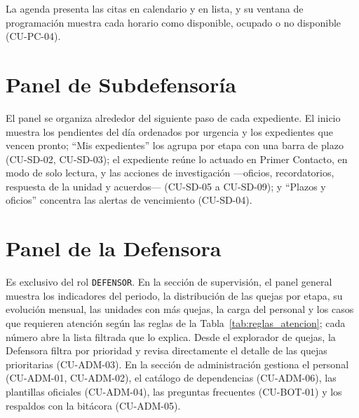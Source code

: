 	La agenda presenta las citas en calendario y en lista, y su ventana de programación muestra cada
	horario como disponible, ocupado o no disponible (CU-PC-04).

	\section{Panel de Subdefensoría}
	\label{sec:modulo_subdefensoria}
	El panel se organiza alrededor del siguiente paso de cada expediente. El inicio muestra los
	pendientes del día ordenados por urgencia y los expedientes que vencen pronto; ``Mis expedientes''
	los agrupa por etapa con una barra de plazo (CU-SD-02, CU-SD-03); el expediente reúne lo actuado en
	Primer Contacto, en modo de solo lectura, y las acciones de investigación ---oficios, recordatorios,
	respuesta de la unidad y acuerdos--- (CU-SD-05 a CU-SD-09); y ``Plazos y oficios'' concentra las
	alertas de vencimiento (CU-SD-04).

	\section{Panel de la Defensora}
	\label{sec:modulo_admin}
	Es exclusivo del rol \texttt{DEFENSOR}. En la sección de supervisión, el panel general muestra los
	indicadores del periodo, la distribución de las quejas por etapa, su evolución mensual, las unidades
	con más quejas, la carga del personal y los casos que requieren atención según las reglas de la
	Tabla~\ref{tab:reglas_atencion}; cada número abre la lista filtrada que lo explica. Desde el
	explorador de quejas, la Defensora filtra por prioridad y revisa directamente el detalle de las
	quejas prioritarias (CU-ADM-03). En la sección de administración gestiona el personal (CU-ADM-01,
	CU-ADM-02), el catálogo de dependencias (CU-ADM-06), las plantillas oficiales (CU-ADM-04), las
	preguntas frecuentes (CU-BOT-01) y los respaldos con la bitácora (CU-ADM-05).

